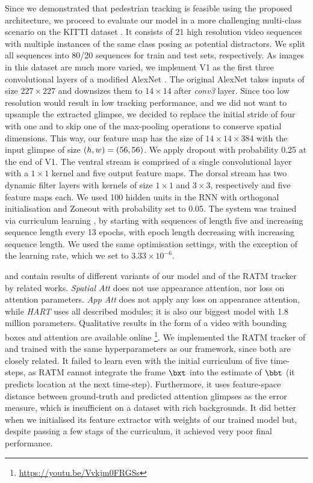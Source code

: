     Since we demonstrated that pedestrian tracking is feasible using the proposed architecture, we proceed to evaluate our model in a more challenging multi-class scenario on the KITTI dataset \cite{Geiger2013}. It consists of 21 high resolution video sequences with multiple instances of the same class posing as potential distractors. We split all sequences into 80/20 sequences for train and test sets, respectively. As images in this dataset are much more varied, we implement V1 as the first three convolutional layers of a modified AlexNet \cite{Krizhevsky2012}. The original AlexNet takes inputs of size $227 \times 227$ and downsizes them to $14 \times 14$ after \emph{conv3} layer. Since too low resolution would result in low tracking performance, and we did not want to upsample the extracted glimpse, we decided to replace the initial stride of four with one and to skip one of the max-pooling operations to conserve spatial dimensions. This way, our feature map has the size of $14 \times 14 \times 384$ with the input glimpse of size $(h, w) = (56, 56)$. We apply dropout with probability 0.25 at the end of V1. The ventral stream is comprised of a single convolutional layer with a $1 \times 1$ kernel and five output feature maps. The dorsal stream has two dynamic filter layers with kernels of size $1 \times 1$ and $3 \times 3$, respectively and five feature maps each. We used 100 hidden units in the RNN with orthogonal initialisation and Zoneout \cite{Krueger2016} with probability set to 0.05. The system was trained via curriculum learning \cite{Bengio2009}, by starting with sequences of length five and increasing sequence length every 13 epochs, with epoch length decreasing with increasing sequence length. We used the same optimisation settings, with the exception of the learning rate, which we set to $3.33 \times 10^{-6}$.
    
    
     and  contain results of different variants of our model and of the RATM tracker by \citet{Kahou2015ratm} related works. \emph{Spatial Att} does not use appearance attention, nor loss on attention parameters. \emph{App Att} does not apply any loss on appearance attention, while \emph{HART} uses all described modules; it is also our biggest model with 1.8 million parameters. Qualitative results in the form of a video with bounding boxes and attention are available online \footnote{\url{https://youtu.be/Vvkjm0FRGSs}}. We implemented the RATM tracker of \citet{Kahou2015ratm} and trained with the same hyperparameters as our framework, since both are closely related. It failed to learn even with the initial curriculum of five time-steps, as RATM cannot integrate the frame $\bxt$ into the estimate of $\bbt$ (it predicts location at the next time-step). Furthermore, it uses feature-space distance between ground-truth and predicted attention glimpses as the error measure, which is insufficient on a dataset with rich backgrounds. It did better when we initialised its feature extractor with weights of our trained model but, despite passing a few stags of the curriculum, it achieved very poor final performance. 